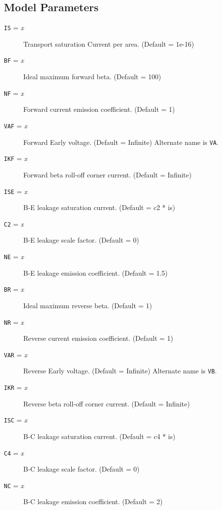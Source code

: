 \subsection{Model Parameters}

\begin{description}

\item[{\tt IS} = {\it x}]
Transport saturation Current per area.  (Default = 1e-16)

\item[{\tt BF} = {\it x}]
Ideal maximum forward beta. (Default = 100)

\item[{\tt NF} = {\it x}]
Forward current emission coefficient.  (Default = 1)

\item[{\tt VAF} = {\it x}]
Forward Early voltage.  (Default = Infinite)  Alternate name is {\tt VA}.

\item[{\tt IKF} = {\it x}]
Forward beta roll-off corner current.  (Default = Infinite)

\item[{\tt ISE} = {\it x}]
B-E leakage saturation current.  (Default = c2 * is)

\item[{\tt C2} = {\it x}]
B-E leakage scale factor.  (Default = 0)

\item[{\tt NE} = {\it x}]
B-E leakage emission coefficient.  (Default = 1.5)

\item[{\tt BR} = {\it x}]
Ideal maximum reverse beta.  (Default = 1)

\item[{\tt NR} = {\it x}]
Reverse current emission coefficient. (Default = 1)

\item[{\tt VAR} = {\it x}]
Reverse Early voltage.  (Default = Infinite)  Alternate name is {\tt VB}.

\item[{\tt IKR} = {\it x}]
Reverse beta roll-off corner current.  (Default = Infinite)

\item[{\tt ISC} = {\it x}]
B-C leakage saturation current.  (Default = c4 * is)

\item[{\tt C4} = {\it x}]
B-C leakage scale factor. (Default = 0)

\item[{\tt NC} = {\it x}]
B-C leakage emission coefficient.  (Default = 2)


\end{description}
